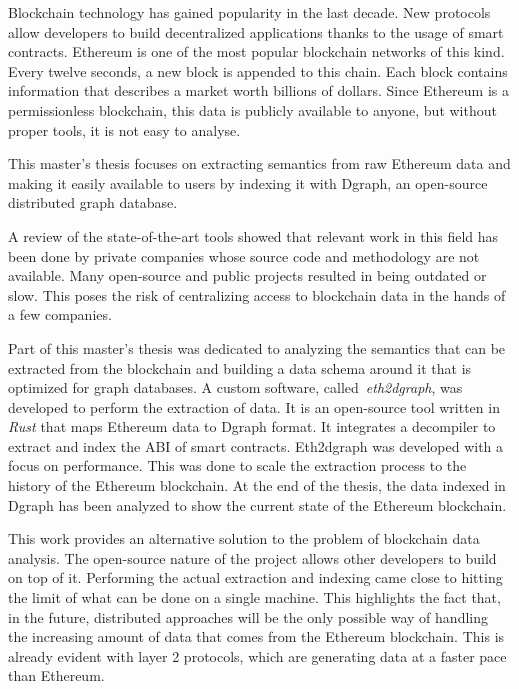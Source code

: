 Blockchain technology has gained popularity in the last decade. New protocols allow developers to build decentralized applications thanks to the usage of smart contracts. Ethereum is one of the most popular blockchain networks of this kind. Every twelve seconds, a new block is appended to this chain. Each block contains information that describes a market worth billions of dollars. Since Ethereum is a permissionless blockchain, this data is publicly available to anyone, but without proper tools, it is not easy to analyse.

This master's thesis focuses on extracting semantics from raw Ethereum data and making it easily available to users by indexing it with Dgraph, an open-source distributed graph database. 

A review of the state-of-the-art tools showed that relevant work in this field has been done by private companies whose source code and methodology are not available. Many open-source and public projects resulted in being outdated or slow. This poses the risk of centralizing access to blockchain data in the hands of a few companies.

Part of this master's thesis was dedicated to analyzing the semantics that can be extracted from the blockchain and building a data schema around it that is optimized for graph databases. A custom software, called~\textit{eth2dgraph}, was developed to perform the extraction of data. It is an open-source tool written in \textit{Rust} that maps Ethereum data to Dgraph format. It integrates a decompiler to extract and index the ABI of smart contracts. Eth2dgraph was developed with a focus on performance. This was done to scale the extraction process to the history of the Ethereum blockchain. At the end of the thesis, the data indexed in Dgraph has been analyzed to show the current state of the Ethereum blockchain.

This work provides an alternative solution to the problem of blockchain data analysis. The open-source nature of the project allows other developers to build on top of it. Performing the actual extraction and indexing came close to hitting the limit of what can be done on a single machine. This highlights the fact that, in the future, distributed approaches will be the only possible way of handling the increasing amount of data that comes from the Ethereum blockchain. This is already evident with layer 2 protocols, which are generating data at a faster pace than Ethereum.

